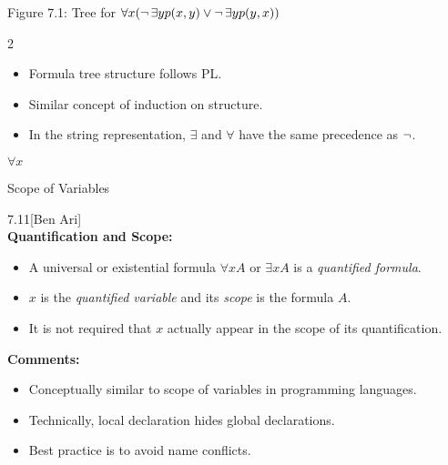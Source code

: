 \begin{wideslide}[bm=,toc=]{Figure 7.1: Tree for
$\forall x(\mathop{\neg}\exists yp(x,y)\vee\mathop{\neg}\exists yp(y,x))$}
\begin{multicols}{2}
\begin{itemize}
\item Formula tree structure follows PL.
\item Similar concept of induction on structure.
\item In the string representation, $\exists$ and $\forall$ have the same precedence as $\mathop{\neg}$.
\end{itemize}
\begin{center}
\setlength{\GapWidth}{8mm}
\setlength{\GapDepth}{8mm}
\begin{bundle}{$\forall x$\rule[-1mm]{0mm}{1mm}}
\end{bundle}
\end{center}
\end{multicols}
\end{wideslide}

\begin{wideslide}[bm=,toc=]{Scope of Variables}
\begin{defn}{7.11}[Ben Ari]~\\
\textbf{Quantification and Scope:}
\begin{itemize}
\item<2-> A universal or existential formula $\forall x A$ or $\exists x A$
is a \emph{quantified formula}. 
\item<3-> $x$ is the \emph{quantified variable}
and its \emph{scope} is the formula $A$. 
\item<4-> It is not required that $x$ actually appear in the scope of its 
quantification.
\end{itemize}
\end{defn}
\pause[4]
\textbf{Comments:}
\begin{itemize}
\item<6-> Conceptually similar to scope of variables in programming languages.
\item<7-> Technically, local declaration hides global declarations.
\item<8-> Best practice is to avoid name conflicts.
\end{itemize}
\end{wideslide}

